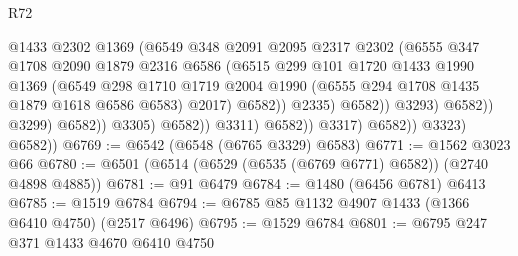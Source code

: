 \begin{lexlean}{R72}
\begin{coremodule}
                                            @1433
                                            @2302
                                            @1369
                                            (@6549
                                              @348
                                              @2091
                                              @2095
                                              @2317
                                              @2302
                                              (@6555
                                                @347
                                                @1708
                                                @2090
                                                @1879
                                                @2316
                                                @6586
                                                (@6515
                                                  @299
                                                  @101
                                                  @1720
                                                  @1433
                                                  @1990
                                                  @1369
                                                  (@6549
                                                    @298
                                                    @1710
                                                    @1719
                                                    @2004
                                                    @1990
                                                    (@6555 @294 @1708 @1435 @1879 @1618 @6586 @6583)
                                                    @2017)
                                                  @6582))
                                              @2335)
                                            @6582))
                                        @3293)
                                      @6582))
                                  @3299)
                                @6582))
                            @3305)
                          @6582))
                      @3311)
                    @6582))
                @3317)
              @6582))
          @3323)
        @6582))
@6769 := @6542 (@6548 (@6765 @3329) @6583)
@6771 := @1562 @3023 @66
@6780 := @6501 (@6514 (@6529 (@6535 (@6769 @6771) @6582)) (@2740 @4898 @4885))
@6781 := @91 @6479
@6784 := @1480 (@6456 @6781) @6413
@6785 := @1519 @6784
@6794 := @6785 @85 @1132 @4907 @1433 (@1366 @6410 @4750) (@2517 @6496)
@6795 := @1529 @6784
@6801 := @6795 @247 @371 @1433 @4670 @6410 @4750

\end{coremodule}
\end{lexlean}
